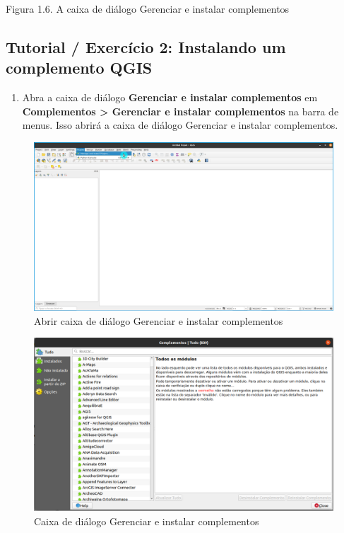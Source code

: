 \documentclass[
  portuguese,
]{krantz}
\providecommand{\tightlist}{%
  \setlength{\itemsep}{0pt}\setlength{\parskip}{0pt}}
\begin{document}
Figura 1.6. A caixa de diálogo Gerenciar e instalar complementos

\hypertarget{tutorial-exercuxedcio-2-instalando-um-complemento-qgis}{%
\subsection{\texorpdfstring{\textbf{Tutorial / Exercício 2: Instalando um complemento QGIS}}{Tutorial / Exercício 2: Instalando um complemento QGIS}}\label{tutorial-exercuxedcio-2-instalando-um-complemento-qgis}}

\begin{enumerate}
\def\labelenumi{\arabic{enumi}.}
\tightlist
\item
  Abra a caixa de diálogo \textbf{Gerenciar e instalar complementos} em \textbf{Complementos \textgreater{} Gerenciar e instalar complementos} na barra de menus. Isso abrirá a caixa de diálogo Gerenciar e instalar complementos.
\end{enumerate}

\begin{figure}
\centering
\includegraphics{media/modulo1/plugins-menu-2.png}
\caption{Abrir caixa de diálogo Gerenciar e instalar complementos}
\end{figure}

\begin{figure}
\centering
\includegraphics{media/modulo1/manage-and-install-plugins-dialog.png}
\caption{Caixa de diálogo Gerenciar e instalar complementos}
\end{figure}
\end{document}
